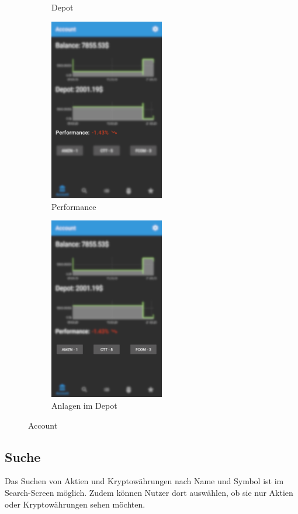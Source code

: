 \documentclass[a4paper]{article}
\begin{document}
\begin{figure}[H]
\begin{subfigure}{.5\textwidth}
        \caption{Depot}
        \label{fig:functionality:account:depot}
    \end{subfigure}
    \begin{subfigure}{.5\textwidth}
        \centering
        \includegraphics[height=8cm,keepaspectratio]{./images/account/performance.png}
        \caption{Performance}
        \label{fig:functionality:account:performance}
    \end{subfigure}
    \begin{subfigure}{.5\textwidth}
        \centering
        \includegraphics[height=8cm,keepaspectratio]{./images/account/depot_quotes.png}
        \caption{Anlagen im Depot}
        \label{fig:functionality:account:depot_quotes}
    \end{subfigure}
    \caption{Account}
    \label{fig:functionality:account}
\end{figure}


\subsection{Suche}
\label{subsec:functionality:search}
Das Suchen von Aktien und Kryptowährungen nach Name und Symbol ist im Search-Screen möglich.
Zudem können Nutzer dort auswählen, ob sie nur Aktien oder Kryptowährungen sehen möchten.
\end{document}
